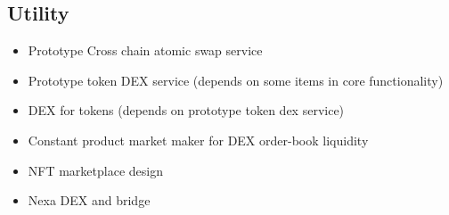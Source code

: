 \documentclass[a4paper, 11pt]{article}
\begin{document}
\subsection{Utility}
\begin{itemize}
    \item Prototype Cross chain atomic swap service
    \item Prototype token DEX service (depends on some items in core functionality)
    \item DEX for tokens (depends on prototype token dex service)
    \item Constant product market maker for DEX order-book liquidity
    \item NFT marketplace design
    \item Nexa DEX and bridge

\end{itemize}
\end{document}
